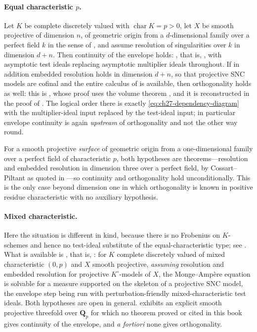 \paragraph{Equal characteristic \(p\).}
Let \(K\) be complete discretely valued with
\(\operatorname{char}K=p>0\), let \(X\) be smooth projective of dimension
\(n\), of geometric origin from a \(d\)-dimensional family over a perfect
field \(k\) in the sense of , and assume
resolution of singularities over \(k\) in dimension \(d+n\).  Then
continuity of the envelope holds:
, that is,
\cite[Theorem~8.2]{GJKM19}, with asymptotic test ideals replacing asymptotic
multiplier ideals throughout.  If in addition embedded resolution holds in
dimension \(d+n\), so that projective SNC models are cofinal and the entire
calculus of  is available,
then orthogonality holds as well: this is
\cite[Theorem~9.2]{GJKM19}, whose proof uses the volume theorem
\cite[Theorem~6.3.2]{BGGJKM20}, and it is reconstructed in the proof of
.  The logical order there is
exactly \eqref{eq:ch27-dependency-diagram} with the multiplier-ideal input
replaced by the test-ideal input; in particular envelope continuity is
again \emph{upstream} of orthogonality and not the other way round.

For a smooth projective \emph{surface} of geometric origin from a
one-dimensional family over a perfect field of characteristic \(p\), both
hypotheses are theorems---resolution and embedded resolution in dimension
three over a perfect field, by Cossart--Piltant as quoted in
---so continuity and orthogonality hold
unconditionally.  This is the only case beyond dimension one in which
orthogonality is known in positive residue characteristic with no auxiliary
hypothesis.

\paragraph{Mixed characteristic.}
Here the situation is different in kind, because there is no Frobenius on
\(K\)-schemes and hence no test-ideal substitute of the equal-characteristic
type; see .  What is available is
, that is, \cite{FGK25}: for \(K\)
complete discretely valued of mixed characteristic \((0,p)\) and \(X\)
smooth projective, \emph{assuming} resolution and embedded resolution for
projective \(K^\circ\)-models of \(X\), the Monge--Amp\`ere equation is
solvable for a measure supported on the skeleton of a projective SNC model,
the envelope step being run with perturbation-friendly mixed-characteristic
test ideals.  Both hypotheses are open in general.
 exhibits an explicit smooth projective
threefold over \(\mathbf Q_p\) for which no theorem proved or cited in this
book gives continuity of the envelope, and \emph{a fortiori} none gives
orthogonality.

